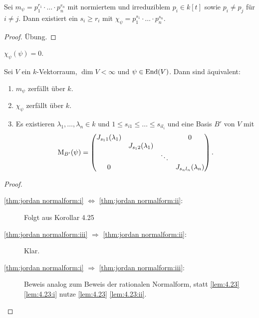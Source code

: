 \documentclass[12pt,a4paper]{scrartcl}
\theoremstyle{cplain}
\theoremstyle{cdef}
\begin{document}
\begin{kor}
	Sei $m_{\psi} = p_1^{r_1}\cdot\ldots\cdot p_n^{r_n}$ mit normiertem und irreduziblem $p_i\in k[t]$ sowie $p_i\neq p_j$ für $i\neq j$. Dann existiert ein $s_i\ge r_i$ mit $\chi_{\psi} = p_1^{s_1}\cdot\ldots\cdot p_n^{s_n}$.
\end{kor}
\begin{proof}
	Übung.
\end{proof}

\begin{kor}
	$\chi_{\psi}(\psi) = 0$.
\end{kor}

\begin{satz}
	Sei $V$ ein $k$-Vektorraum, $\dim V<\infty$ und $\psi\in\operatorname{End}(V)$. Dann sind äquivalent:
	\begin{enumerate}
		\item $m_{\psi}$ zerfällt über $k$. \label{thm:jordan normalform:i}
		\item $\chi_{\psi}$ zerfällt über $k$. \label{thm:jordan normalform:ii}
		\item Es existieren $\lambda_1,\dots, \lambda_n\in k$ und $1\le s_{i1}\le\dots\le s_{il_i}$ und eine Basis $B'$ von $V$ mit
		\[\operatorname{M}_{B'}(\psi) = \begin{pmatrix}
		J_{s_11}(\lambda_1) &  &  & 0 \\ 
		& J_{s_12}(\lambda_1) &  &  \\ 
		&  & \ddots &  \\ 
		0 &  &  & J_{s_{n}l_n}(\lambda_n)
		\end{pmatrix}.\] \label{thm:jordan normalform:iii}
	\end{enumerate}
\end{satz}
\begin{proof}
	\leavevmode
	\begin{description}
		\item[\ref{thm:jordan normalform:i} $\Leftrightarrow$ \ref{thm:jordan normalform:ii}:] Folgt aus Korollar 4.25
		\item[\ref{thm:jordan normalform:iii} $\Rightarrow$ \ref{thm:jordan normalform:ii}:] Klar.
		\item[\ref{thm:jordan normalform:i} $\Rightarrow$ \ref{thm:jordan normalform:iii}:] Beweis analog zum Beweis der rationalen Normalform, statt \cref{lem:4.23} \ref{lem:4.23:i} nutze \cref{lem:4.23} \ref{lem:4.23:ii}.
		\qedhere
	\end{description}
\end{proof}
\end{document}
